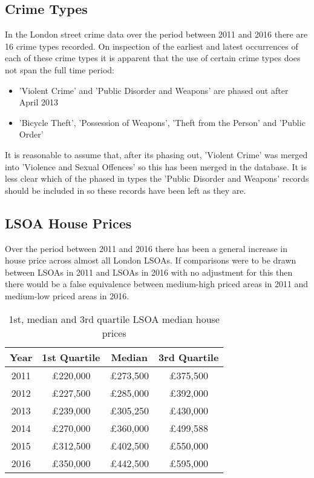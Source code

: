 \documentclass{article}
\begin{document}
\subsection{Crime Types}
In the London street crime data over the period between 2011 and 2016 there are 16 crime types recorded. On inspection of the earliest and latest occurrences of each of these crime types it is apparent that the use of certain crime types does not span the full time period:

\begin{itemize}
\item 'Violent Crime' and 'Public Disorder and Weapons' are phased out after April 2013
\item 'Bicycle Theft', 'Possession of Weapons', 'Theft from the Person' and 'Public Order' 
\end{itemize}
\smallskip
It is reasonable to assume that, after its phasing out, 'Violent Crime' was merged into 'Violence and Sexual Offences' so this has been merged in the database. It is less clear which of the phased in types the 'Public Disorder and Weapons' records should be included in so these records have been left as they are.

\subsection{LSOA House Prices}

Over the period between 2011 and 2016 there has been a general increase in house price across almost all London LSOAs. If comparisons were to be drawn between LSOAs in 2011 and LSOAs in 2016 with no adjustment for this then there would be a false equivalence between medium-high priced areas in 2011 and medium-low priced areas in 2016.

\begin{table}[H]
  \begin{center}
    \caption{1st, median and 3rd quartile LSOA median house prices}
    \label{tab:table1}
    \begin{tabular}{|c|c c c|}
    \hline
      \textbf{Year} & \textbf{1st Quartile} & \textbf{Median} & \textbf{3rd Quartile} \\
      \hline
      2011 &  \pounds 220,000 & \pounds 273,500 & \pounds 375,500 \\ 
  	  \hline
  	  2012 & \pounds 227,500 & \pounds 285,000 & \pounds 392,000 \\
  	  \hline
  	  2013 & \pounds 239,000 & \pounds 305,250 & \pounds 430,000 \\
  	  \hline
  	  2014 & \pounds 270,000 & \pounds 360,000 & \pounds 499,588 \\
  	  \hline
  	  2015 & \pounds 312,500 & \pounds 402,500 & \pounds 550,000 \\
  	  \hline
  	  2016 & \pounds 350,000 & \pounds 442,500 & \pounds 595,000 \\
      \hline
    \end{tabular}
  \end{center}
\end{table}
\end{document}
